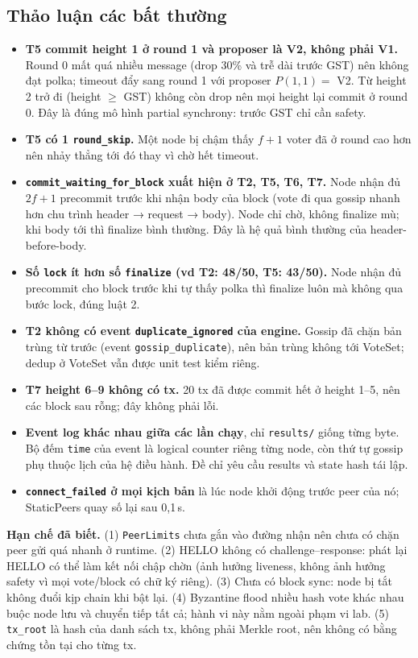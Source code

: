 \documentclass[11pt,a4paper]{article}
\newcommand{\code}[1]{\texttt{#1}}
\begin{document}
\subsection{Thảo luận các bất thường}
\begin{itemize}
\item \textbf{T5 commit height 1 ở round 1 và proposer là V2, không phải V1.} Round 0 mất quá nhiều message (drop 30\% và trễ dài trước GST) nên không đạt polka; timeout đẩy sang round 1 với proposer $P(1,1) = $ V2. Từ height 2 trở đi (height $\ge$ GST) không còn drop nên mọi height lại commit ở round 0. Đây là đúng mô hình partial synchrony: trước GST chỉ cần safety.
\item \textbf{T5 có 1 \code{round\_skip}.} Một node bị chậm thấy $f+1$ voter đã ở round cao hơn nên nhảy thẳng tới đó thay vì chờ hết timeout.
\item \textbf{\code{commit\_waiting\_for\_block} xuất hiện ở T2, T5, T6, T7.} Node nhận đủ $2f+1$ precommit trước khi nhận body của block (vote đi qua gossip nhanh hơn chu trình header → request → body). Node chỉ chờ, không finalize mù; khi body tới thì finalize bình thường. Đây là hệ quả bình thường của header-before-body.
\item \textbf{Số \code{lock} ít hơn số \code{finalize} (vd T2: 48/50, T5: 43/50).} Node nhận đủ precommit cho block trước khi tự thấy polka thì finalize luôn mà không qua bước lock, đúng luật 2.
\item \textbf{T2 không có event \code{duplicate\_ignored} của engine.} Gossip đã chặn bản trùng từ trước (event \code{gossip\_duplicate}), nên bản trùng không tới VoteSet; dedup ở VoteSet vẫn được unit test kiểm riêng.
\item \textbf{T7 height 6--9 không có tx.} 20 tx đã được commit hết ở height 1--5, nên các block sau rỗng; đây không phải lỗi.
\item \textbf{Event log khác nhau giữa các lần chạy}, chỉ \code{results/} giống từng byte. Bộ đếm \code{time} của event là logical counter riêng từng node, còn thứ tự gossip phụ thuộc lịch của hệ điều hành. Đề chỉ yêu cầu results và state hash tái lập.
\item \textbf{\code{connect\_failed} ở mọi kịch bản} là lúc node khởi động trước peer của nó; StaticPeers quay số lại sau 0,1\,s.
\end{itemize}

\textbf{Hạn chế đã biết.} (1) \code{PeerLimits} chưa gắn vào đường nhận nên chưa có chặn peer gửi quá nhanh ở runtime. (2) HELLO không có challenge--response: phát lại HELLO có thể làm kết nối chập chờn (ảnh hưởng liveness, không ảnh hưởng safety vì mọi vote/block có chữ ký riêng). (3) Chưa có block sync: node bị tắt không đuổi kịp chain khi bật lại. (4) Byzantine flood nhiều hash vote khác nhau buộc node lưu và chuyển tiếp tất cả; hành vi này nằm ngoài phạm vi lab. (5) \code{tx\_root} là hash của danh sách tx, không phải Merkle root, nên không có bằng chứng tồn tại cho từng tx.
\end{document}
